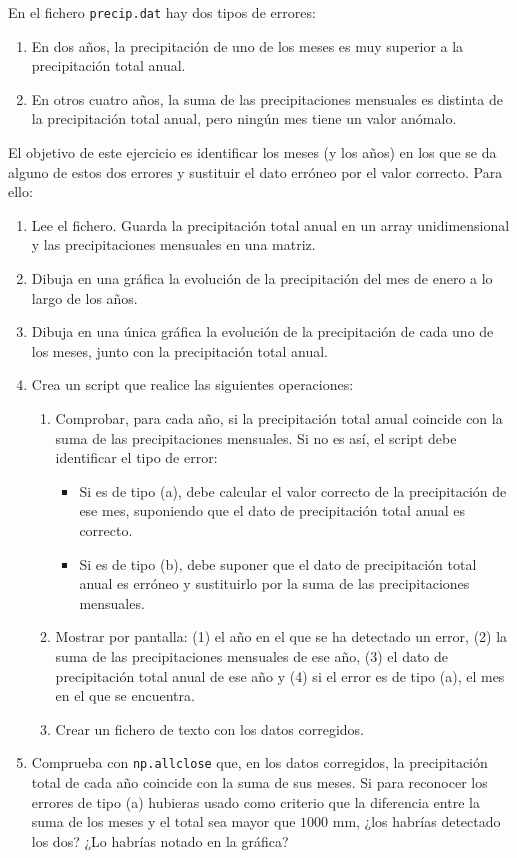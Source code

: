 \begin{enumerate}
En el fichero \texttt{precip.dat} hay dos tipos de errores:
\begin{enumerate}
    \item[(a)] En dos años, la precipitación de uno de los meses es muy superior a la precipitación total anual.
    \item[(b)] En otros cuatro años, la suma de las precipitaciones mensuales es distinta de la precipitación total anual, pero ningún mes tiene un valor anómalo.
\end{enumerate}
El objetivo de este ejercicio es identificar los meses (y los años) en los que se da alguno de estos dos errores y sustituir el dato erróneo por el valor correcto. Para ello:
\begin{enumerate}
    \item Lee el fichero. Guarda la precipitación total anual en un array unidimensional y las precipitaciones mensuales en una matriz.
    \item Dibuja en una gráfica la evolución de la precipitación del mes de enero a lo largo de los años.
    \item Dibuja en una única gráfica la evolución de la precipitación de cada uno de los meses, junto con la precipitación total anual.
    \item Crea un script que realice las siguientes operaciones:
    \begin{enumerate}
        \item Comprobar, para cada año, si la precipitación total anual coincide con la suma de las precipitaciones mensuales. Si no es así, el script debe identificar el tipo de error:
        \begin{itemize}
            \item Si es de tipo (a), debe calcular el valor correcto de la precipitación de ese mes, suponiendo que el dato de precipitación total anual es correcto.
            \item Si es de tipo (b), debe suponer que el dato de precipitación total anual es erróneo y sustituirlo por la suma de las precipitaciones mensuales.
        \end{itemize}
        \item Mostrar por pantalla: (1) el año en el que se ha detectado un error, (2) la suma de las precipitaciones mensuales de ese año, (3) el dato de precipitación total anual de ese año y (4) si el error es de tipo (a), el mes en el que se encuentra.
        \item Crear un fichero de texto con los datos corregidos.
    \end{enumerate}
    \item Comprueba con \texttt{np.allclose} que, en los datos corregidos, la precipitación total de cada año coincide con la suma de sus meses. Si para reconocer los errores de tipo (a) hubieras usado como criterio que la diferencia entre la suma de los meses y el total sea mayor que $1000$ mm, ¿los habrías detectado los dos? ¿Lo habrías notado en la gráfica?
\end{enumerate}


\end{enumerate}

